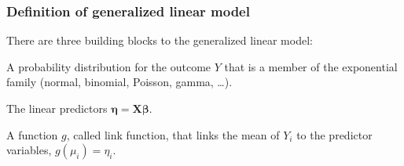 \documentclass{beamer}
\begin{document}
\begin{frame}
\frametitle{Definition of generalized linear model}
\bi
\item There are three building blocks to the generalized linear model:
\bi

\item A probability distribution for the outcome $Y$ that is a member of the exponential family (normal, binomial, Poisson, gamma, \ldots). 
\item The linear predictors $\boldsymbol{\eta} = \mathbf{X}\boldsymbol{\beta}$.
\item A function $g$, called \alert{link function}, that \alert{links} the mean of $Y_i$ to the predictor variables, $g(\mu_i)=\eta_i$.
\ei 

\ei
\end{frame}
% 
% 
\end{document}

